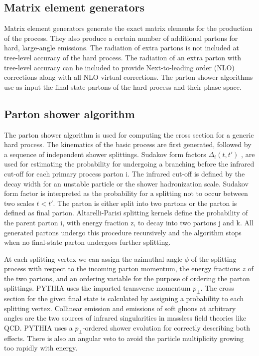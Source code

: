 \subsection{Matrix element generators}

Matrix element generators generate the exact matrix elements for the production of the process. They also produce a certain number of additional partons for hard, large-angle emissions. The radiation of extra partons is not included at tree-level accuracy of the hard process. The radiation of an extra parton with tree-level accuracy can be included to provide Next-to-leading order (NLO) corrections along with all NLO virtual corrections. The parton shower algorithms use as input the final-state partons of the hard process and their phase space.

\subsection{Parton shower algorithm}

The parton shower algorithm is used for computing the cross section for a generic hard process. The kinematics of the basic process are first generated, followed by a sequence of independent shower splittings. Sudakov form factors $\Delta_{i}(t, t')$ \cite{Collins:1989bt}, are used for estimating the probability for undergoing a branching before the infrared cut-off for each primary process parton i. The infrared cut-off is defined by the decay width for an unstable particle or the shower hadronization scale. Sudakov form factor is interpreted as the probability for a splitting not to occur between two scales $t < t'$. The parton is either split into two partons or the parton is defined as final parton. Altarelli-Parisi splitting kernels \cite{Altarelli:1977zs} define the probability of the parent parton i, with energy fraction z, to decay into two partons j and k. All generated partons undergo this procedure recursively and the algorithm stops when no final-state parton undergoes further splitting.

At each splitting vertex we can assign the azimuthal angle $\phi$ of the splitting process with respect to the incoming parton momentum, the energy fractions $z$ of the two partons, and an ordering variable for the purpose of ordering the parton splittings. PYTHIA uses the imparted transverse momentum $p_{\perp}$. The cross section for the given final state is calculated by assigning a probability to each splitting vertex. Collinear emission and emissions of soft gluons at arbitrary angles are the two sources of infrared singularities in massless field theories like QCD. PYTHIA uses a $p_{\perp}$-ordered shower evolution for correctly describing both effects. There is also an angular veto to avoid the particle multiplicity growing too rapidly with energy.

